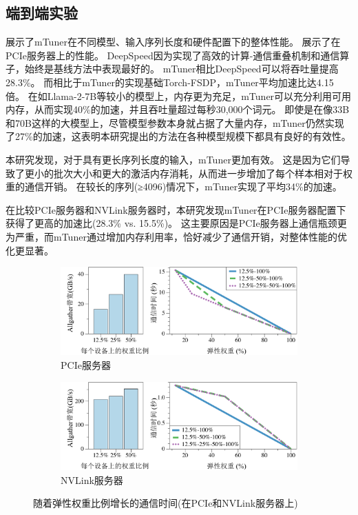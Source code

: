 \subsection{端到端实验}

展示了mTuner在不同模型、输入序列长度和硬件配置下的整体性能。  
展示了在PCIe服务器上的性能。  
DeepSpeed因为实现了高效的计算-通信重叠机制和通信算子，始终是基线方法中表现最好的。  
mTuner相比DeepSpeed可以将吞吐量提高28.3\%。
而相比于mTuner的实现基础Torch-FSDP，mTuner平均加速比达4.15倍。  
在如Llama-2-7B等较小的模型上，内存更为充足，mTuner可以充分利用可用内存，从而实现40\%的加速，并且吞吐量超过每秒30,000个词元。  
即使是在像33B和70B这样的大模型上，尽管模型参数本身就占据了大量内存，mTuner仍然实现了27\%的加速，这表明本研究提出的方法在各种模型规模下都具有良好的有效性。

本研究发现，对于具有更长序列长度的输入，mTuner更加有效。  
这是因为它们导致了更小的批次大小和更大的激活内存消耗，从而进一步增加了每个样本相对于权重的通信开销。  
在较长的序列(≥4096)情况下，mTuner实现了平均34\%的加速。

在比较PCIe服务器和NVLink服务器时，本研究发现mTuner在PCIe服务器配置下获得了更高的加速比(28.3\% vs. 15.5\%)。  
这主要原因是PCIe服务器上通信瓶颈更为严重，而mTuner通过增加内存利用率，恰好减少了通信开销，对整体性能的优化更显著。



\begin{figure}[ht]
     \centering
     \begin{subfigure}[b]{0.75\textwidth}
         \centering
         \includegraphics[width=\textwidth]{figures/mtuner/exp-img/weight-comm-pcie-crop.pdf}
         \caption{PCIe服务器}
         \label{fig:dp-change-1}
     \end{subfigure}
     \vfill
     \begin{subfigure}[b]{0.75\textwidth}
         \centering
         \includegraphics[width=\textwidth]{figures/mtuner/exp-img/weight-comm-nvlink-crop.pdf}
         \caption{NVLink服务器}
         \label{fig:dp-change-2}
    \end{subfigure}
        \caption{随着弹性权重比例增长的通信时间(在PCIe和NVLink服务器上)}
        \label{fig:dp-change}
\end{figure}

